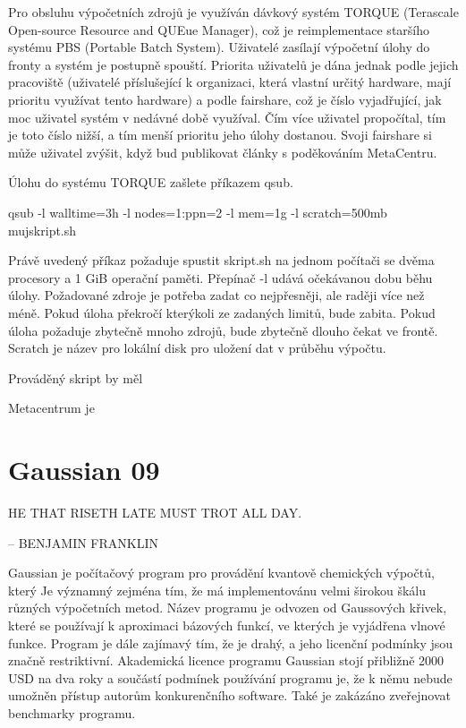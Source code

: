 \documentclass[
  color, %
  table, %
  lof,   %
  lot,   %
]{fithesis3}
\begin{document}
Pro obsluhu výpočetních zdrojů je využíván dávkový systém TORQUE (Terascale Open-source Resource and QUEue Manager), což je reimplementace staršího systému PBS (Portable Batch System). Uživatelé zasílají výpočetní úlohy do fronty a systém je postupně spouští. Priorita uživatelů je dána jednak podle jejich pracoviště (uživatelé příslušející k organizaci, která vlastní určitý hardware, mají prioritu využívat tento hardware) a podle fairshare, což je číslo vyjadřující, jak moc uživatel systém v nedávné době využíval. Čím více uživatel propočítal, tím je toto číslo nižší, a tím menší prioritu jeho úlohy dostanou. Svoji fairshare si může uživatel zvýšit, když bud publikovat články s poděkováním MetaCentru.

Úlohu do systému TORQUE zašlete příkazem qsub.

qsub -l walltime=3h -l nodes=1:ppn=2 -l mem=1g -l scratch=500mb mujskript.sh

Právě uvedený příkaz požaduje spustit skript.sh na jednom počítači se dvěma procesory a 1 GiB operační paměti. Přepínač -l udává očekávanou dobu běhu úlohy. Požadované zdroje je potřeba zadat co nejpřesněji, ale raději více než méně. Pokud úloha překročí kterýkoli ze zadaných limitů, bude zabita. Pokud úloha požaduje zbytečně mnoho zdrojů, bude zbytečně dlouho čekat ve frontě. Scratch je název pro lokální disk pro uložení dat v průběhu výpočtu.

Prováděný skript by měl 



Metacentrum je 

\section{Gaussian 09}

HE THAT RISETH LATE MUST TROT ALL DAY.

                  -- BENJAMIN FRANKLIN

Gaussian je počítačový program pro provádění kvantově chemických výpočtů, který Je významný zejména tím, že má implementovánu velmi širokou škálu různých výpočetních metod. Název programu je odvozen od Gaussových křivek, které se používají k aproximaci bázových funkcí, ve kterých je vyjádřena vlnové funkce. Program je dále zajímavý tím, že je drahý, a jeho licenční podmínky jsou značně restriktivní. Akademická licence programu Gaussian stojí přibližně 2000 USD na dva roky a součástí podmínek používání programu je, že k němu nebude umožněn přístup autorům konkurenčního software. Také je zakázáno zveřejnovat benchmarky programu. 
\end{document}

